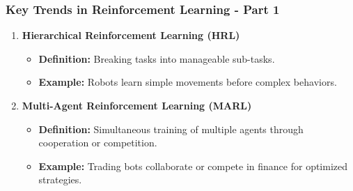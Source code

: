 \documentclass{beamer}
\begin{document}
\begin{frame}[fragile]
    \frametitle{Key Trends in Reinforcement Learning - Part 1}
    \begin{enumerate}
        \item \textbf{Hierarchical Reinforcement Learning (HRL)}
            \begin{itemize}
                \item \textbf{Definition:} Breaking tasks into manageable sub-tasks.
                \item \textbf{Example:} Robots learn simple movements before complex behaviors.
            \end{itemize}
        
        \item \textbf{Multi-Agent Reinforcement Learning (MARL)}
            \begin{itemize}
                \item \textbf{Definition:} Simultaneous training of multiple agents through cooperation or competition.
                \item \textbf{Example:} Trading bots collaborate or compete in finance for optimized strategies.
            \end{itemize}
    \end{enumerate}
\end{frame}
\end{document}
